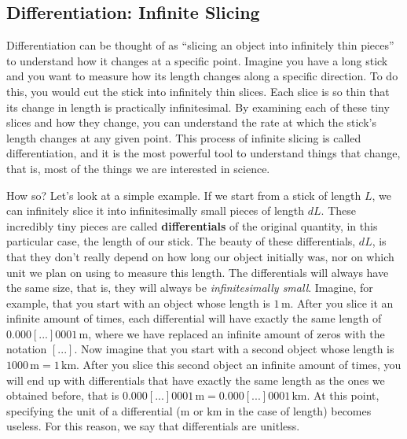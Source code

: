 \documentclass[
  9pt,
]{extbook}
\theoremstyle{definition}
\theoremstyle{definition}
\theoremstyle{definition}
\theoremstyle{definition}
\theoremstyle{remark}
\begin{document}
\subsection{Differentiation: Infinite Slicing}\label{infslici}

Differentiation can be thought of as ``slicing an object into infinitely thin pieces'' to understand how it changes at a specific point. Imagine you have a long stick and you want to measure how its length changes along a specific direction. To do this, you would cut the stick into infinitely thin slices. Each slice is so thin that its change in length is practically infinitesimal. By examining each of these tiny slices and how they change, you can understand the rate at which the stick's length changes at any given point. This process of infinite slicing is called differentiation, and it is the most powerful tool to understand things that change, that is, most of the things we are interested in science.

How so? Let's look at a simple example. If we start from a stick of length \(L\), we can infinitely slice it into infinitesimally small pieces of length \(dL\). These incredibly tiny pieces are called \textbf{differentials} of the original quantity, in this particular case, the length of our stick. The beauty of these differentials, \(dL\), is that they don't really depend on how long our object initially was, nor on which unit we plan on using to measure this length. The differentials will always have the same size, that is, they will always be \emph{infinitesimally small}. Imagine, for example, that you start with an object whose length is \(1\, \text{m}\). After you slice it an infinite amount of times, each differential will have exactly the same length of \(0.000[...]0001\, \text{m}\), where we have replaced an infinite amount of zeros with the notation \([...]\). Now imagine that you start with a second object whose length is \(1000\, \text{m} = 1\,\text{km}\). After you slice this second object an infinite amount of times, you will end up with differentials that have exactly the same length as the ones we obtained before, that is \(0.000[...]0001\, \text{m} = 0.000[...]0001\, \text{km}\). At this point, specifying the unit of a differential (\(\text{m}\) or \(\text{km}\) in the case of length) becomes useless. For this reason, we say that differentials are unitless.
\end{document}
